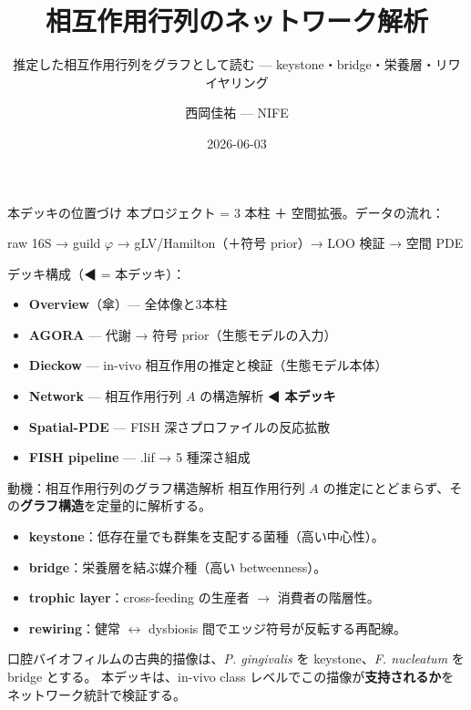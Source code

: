 \documentclass[
  ignorenonframetext,
  aspectratio=169,
]{beamer}
\title{相互作用行列のネットワーク解析}
\subtitle{推定した相互作用行列をグラフとして読む ---
keystone・bridge・栄養層・リワイヤリング}
\author{西岡佳祐 --- NIFE}
\date{2026-06-03}
\providecommand{\tightlist}{%
  \setlength{\itemsep}{0pt}\setlength{\parskip}{0pt}}
\begin{document}
\frame{\titlepage}

\begin{frame}{本デッキの位置づけ}
\protect\hypertarget{ux672cux30c7ux30c3ux30adux306eux4f4dux7f6eux3065ux3051}{}
本プロジェクト = 3 本柱 ＋ 空間拡張。データの流れ：

raw 16S → guild \(\varphi\) → gLV/Hamilton（＋符号 prior）→ LOO 検証 →
空間 PDE

デッキ構成（◀ = 本デッキ）：

\begin{itemize}
\tightlist
\item
  \textbf{Overview}（傘）--- 全体像と3本柱
\item
  \textbf{AGORA} --- 代謝 → 符号 prior（生態モデルの入力）
\item
  \textbf{Dieckow} --- in-vivo 相互作用の推定と検証（生態モデル本体）
\item
  \textbf{Network} --- 相互作用行列 \(A\) の構造解析 ◀ \textbf{本デッキ}
\item
  \textbf{Spatial-PDE} --- FISH 深さプロファイルの反応拡散
\item
  \textbf{FISH pipeline} --- .lif → 5 種深さ組成
\end{itemize}
\end{frame}

\begin{frame}{動機：相互作用行列のグラフ構造解析}
\protect\hypertarget{ux52d5ux6a5fux76f8ux4e92ux4f5cux7528ux884cux5217ux306eux30b0ux30e9ux30d5ux69cbux9020ux89e3ux6790}{}
相互作用行列 \(A\)
の推定にとどまらず、その\textbf{グラフ構造}を定量的に解析する。

\begin{itemize}
\tightlist
\item
  \textbf{keystone}：低存在量でも群集を支配する菌種（高い中心性）。
\item
  \textbf{bridge}：栄養層を結ぶ媒介種（高い betweenness）。
\item
  \textbf{trophic layer}：cross-feeding の生産者 \(\to\)
  消費者の階層性。
\item
  \textbf{rewiring}：健常 \(\leftrightarrow\) dysbiosis
  間でエッジ符号が反転する再配線。
\end{itemize}

\vspace{0.4em}

口腔バイオフィルムの古典的描像は、\emph{P. gingivalis} を
keystone、\emph{F. nucleatum} を bridge とする。 本デッキは、in-vivo
class
レベルでこの描像が\textbf{支持されるか}をネットワーク統計で検証する。
\end{frame}
\end{document}
